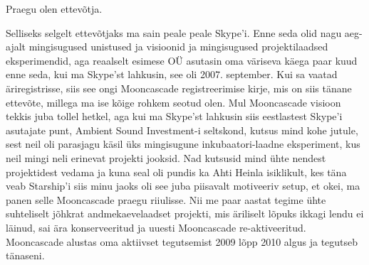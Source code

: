 Praegu olen ettevõtja. 


Selliseks selgelt ettevõtjaks ma sain peale peale Skype'i. Enne 
seda olid nagu aeg-ajalt  mingisugused unistused ja visioonid ja  mingisugused 
projektilaadsed eksperimendid, aga reaalselt esimese OÜ asutasin oma väriseva 
käega paar kuud enne seda, kui ma Skype'st lahkusin, see oli 2007. september. 
Kui sa vaatad äriregistrisse, siis see ongi Mooncascade 
registreerimise kirje, mis on siis tänane ettevõte, millega ma ise kõige rohkem 
seotud olen. Mul Mooncascade visioon tekkis juba tollel hetkel, aga kui ma  
Skype'st lahkusin siis eestlastest Skype'i asutajate punt, Ambient Sound 
Investment-i seltskond, kutsus mind kohe jutule, sest  neil oli parasjagu 
käsil üks mingisugune inkubaatori-laadne eksperiment, kus neil mingi neli 
erinevat projekti jooksid. Nad kutsusid mind ühte nendest projektidest vedama 
ja kuna seal oli pundis ka Ahti Heinla isiklikult, kes 
täna veab Starship'i siis minu jaoks oli see juba piisavalt motiveeriv setup, 
et okei, ma panen selle Mooncascade praegu  riiulisse. Nii me paar aastat 
tegime ühte suhteliselt jõhkrat andmekaevelaadset projekti, mis äriliselt 
lõpuks ikkagi lendu ei läinud, sai ära konserveeritud ja  uuesti Mooncascade 
re-aktiveeritud.  Mooncascade alustas oma aktiivset tegutsemist 2009 lõpp 2010 
algus ja tegutseb tänaseni. 
